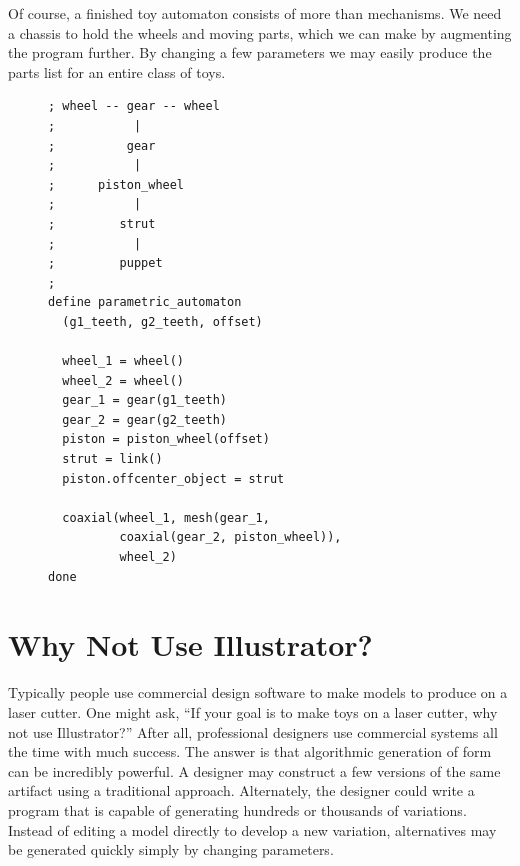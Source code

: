 \documentclass[times, 10pt,twocolumn]{article}
\makeatletter
\newenvironment{subfloat}%
{\def\caption##1{\gdef\subcapsave{\relax##1}}%
\let\subcapsave=\@empty %
\let\sf@oldlabel=\label 
\def\label##1{\xdef\sublabsave{\noexpand\label{##1}}}%
\let\sublabsave\relax %
\setbox\subfigbox\hbox 
\bgroup}%
{\egroup %
\let\label=\sf@oldlabel 
\subfigure[\subcapsave]{\box\subfigbox}}%
\makeatother
\begin{document}
Of course, a finished toy automaton consists of more than
mechanisms. We need a chassis to hold the wheels and moving parts,
which we can make by augmenting the program further. By changing a few
parameters we may easily produce the parts list for an entire class of
toys.

\begin{figure}
  \begin{subfloat}
    \begin{minipage}{2.6in}
      \small
\begin{verbatim}
; wheel -- gear -- wheel
;           |
;          gear
;           |
;      piston_wheel
;           |
;         strut
;           |
;         puppet
;
define parametric_automaton
  (g1_teeth, g2_teeth, offset)

  wheel_1 = wheel()
  wheel_2 = wheel()
  gear_1 = gear(g1_teeth)
  gear_2 = gear(g2_teeth)
  piston = piston_wheel(offset)
  strut = link()
  piston.offcenter_object = strut

  coaxial(wheel_1, mesh(gear_1, 
          coaxial(gear_2, piston_wheel)), 
          wheel_2)
done
\end{verbatim}
    \end{minipage}
  \end{subfloat}
  \caption{A parametric version of the previous automaton.}
  \label{fig:automaton-parameteric}
\end{figure}

\section{Why Not Use Illustrator?}


Typically people use commercial design software to make models to
produce on a laser cutter. One might ask, ``If your goal is to make
toys on a laser cutter, why not use Illustrator?''  After all,
professional designers use commercial systems all the time with much
success. The answer is that algorithmic generation of form can be
incredibly powerful. A designer may construct a few versions of the
same artifact using a traditional approach. Alternately, the designer
could write a program that is capable of generating hundreds or
thousands of variations. Instead of editing a model directly to
develop a new variation, alternatives may be generated quickly simply
by changing parameters.
\end{document}

